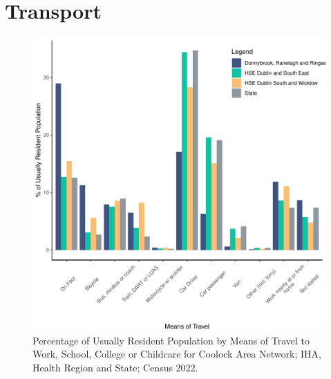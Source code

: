 \documentclass{article}
\begin{document}
\section{Transport}\label{sect:Trans}
\begin{figure}[H]
	\centering
	\includegraphics[width = 120mm]{../figures/TravelED.pdf}
	\caption{Percentage of Usually Resident Population by Means of Travel to Work, School, College or Childcare for Coolock Area Network; IHA, Health Region and State; Census 2022.}
	\label{fig:vbnv}
	\end{figure}
\end{document}
